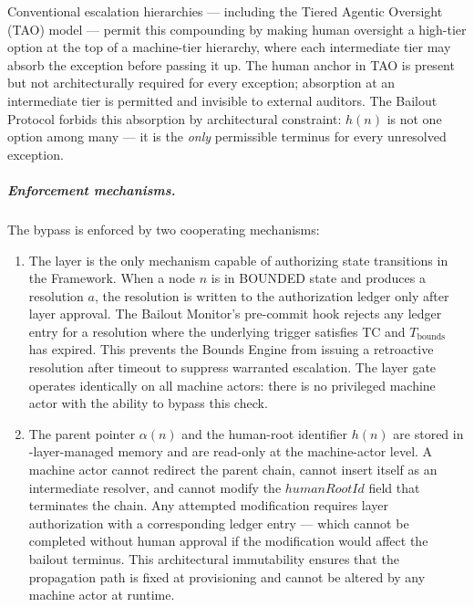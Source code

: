 Conventional escalation hierarchies — including the Tiered Agentic Oversight (TAO) model — permit this compounding by making human oversight a high-tier option at the top of a machine-tier hierarchy, where each intermediate tier may absorb the exception before passing it up. The human anchor in TAO is present but not architecturally required for every exception; absorption at an intermediate tier is permitted and invisible to external auditors. The Bailout Protocol forbids this absorption by architectural constraint: $h(n)$ is not one option among many — it is the \emph{only} permissible terminus for every unresolved exception.

\subparagraph{Enforcement mechanisms.} The bypass is enforced by two cooperating mechanisms:

\begin{enumerate}
\item[\textbf{Fact Layer gate (enforcement at the authorization layer).}] The \fact{} layer is the only mechanism capable of authorizing state transitions in the \bxthree{} Framework. When a node $n$ is in BOUNDED state and produces a resolution $a$, the resolution is written to the authorization ledger only after \fact{} layer approval. The Bailout Monitor's pre-commit hook rejects any ledger entry for a resolution where the underlying trigger satisfies TC and $T_{\text{bounds}}$ has expired. This prevents the Bounds Engine from issuing a retroactive resolution after timeout to suppress warranted escalation. The \fact{} layer gate operates identically on all machine actors: there is no privileged machine actor with the ability to bypass this check.

\item[\textbf{Immutable parent-pointer and human-root architecture (enforcement at the data model layer).}] The parent pointer $\alpha(n)$ and the human-root identifier $h(n)$ are stored in \fact-layer-managed memory and are read-only at the machine-actor level. A machine actor cannot redirect the parent chain, cannot insert itself as an intermediate resolver, and cannot modify the $humanRootId$ field that terminates the chain. Any attempted modification requires \purpose{} layer authorization with a corresponding ledger entry — which cannot be completed without human approval if the modification would affect the bailout terminus. This architectural immutability ensures that the propagation path is fixed at provisioning and cannot be altered by any machine actor at runtime.
\end{enumerate}

